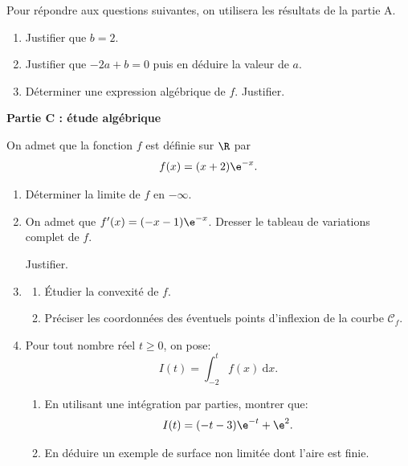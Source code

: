 Pour répondre aux questions suivantes, on utilisera les résultats de la partie A.

\medskip

\begin{enumerate}
\item Justifier que $b = 2$.
\item Justifier que $-2a + b = 0$ puis en déduire la valeur de $a$.
\item Déterminer une expression algébrique de $f$. Justifier.
\end{enumerate}

\medskip

\begin{center}\textbf{Partie C : étude algébrique}\end{center}

On admet que la fonction $f$ est définie sur $\R$ par 
\[f(x) = (x + 2)\e^{-x}.\]

\smallskip

\begin{enumerate}
\item Déterminer la limite de $f$ en $-\infty$.
\item On admet que $f'(x) =(- x - 1)\e^{-x}$. Dresser le tableau de variations complet de $f$.

Justifier.
\item 
	\begin{enumerate}
		\item Étudier la convexité de $f$.
		\item Préciser les coordonnées des éventuels points d'inflexion de la courbe $\mathcal{C}_f$.
	\end{enumerate}
\item Pour tout nombre réel $t \geqslant 0$, on pose:
\[I(t) = \displaystyle\int_{-2}^t f(x)\:\text{d}x.\]

	\begin{enumerate}
		\item En utilisant une intégration par parties, montrer que:
\[I(t) = (- t - 3)\e^{-t} + \e^2.\]

		\item En déduire un exemple de surface non limitée dont l'aire est finie.
	\end{enumerate}
\end{enumerate}
